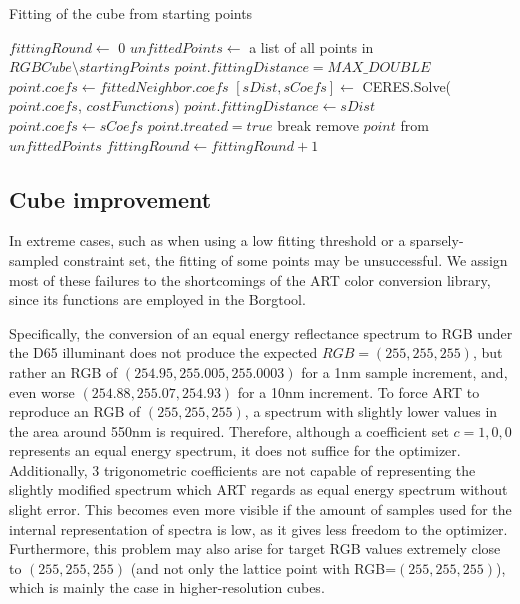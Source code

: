 \begin{algorithm}[t!]
	\caption{Fitting of the cube from starting points}
	\label{alg:upliftingAlgMoments}
	\begin{algorithmic}[1]
		\State $fittingRound \gets$ $0$
		\State $unfittedPoints \gets$ a list of all points in $RGBCube \setminus startingPoints$
		\State $point.fittingDistance = MAX\_DOUBLE$
		\EndFor
		 \label{algStep:coefficientRecomputation}
		\Else
		\State $point.coefs \gets fittedNeighbor.coefs$
		\EndIf 
		\State $[sDist,sCoefs]\gets$ CERES.Solve($point.coefs$, $costFunctions$)
		\State $point.fittingDistance \gets sDist$
		\State $point.coefs \gets sCoefs$
		\EndIf
		\State $point.treated = true$
		\State break
		\EndIf
		\EndFor
		\State remove $point$ from $unfittedPoints$
		\EndIf
		\EndFor	
		\State $fittingRound \gets fittingRound+1$
		\EndWhile
	\end{algorithmic}
\end{algorithm}

\subsection{Cube improvement} \label{ssec:cubeImprovement}

In extreme cases, such as when using a low fitting threshold or a sparsely-sampled constraint set, the fitting of some points may be unsuccessful. We assign most of these failures to the shortcomings of the ART color conversion library, since its functions are employed in the Borgtool.

Specifically, the conversion of an equal energy reflectance spectrum to RGB under the D65 illuminant does not produce the expected $RGB = (255, 255, 255)$, but rather an RGB of $(254.95, 255.005, 255.0003)$ for a 1nm sample increment, and, even worse $(254.88, 255.07, 254.93)$ for a 10nm increment. To force ART to reproduce an RGB of $(255, 255, 255)$, a spectrum with slightly lower values in the area around 550nm is required. Therefore, although a coefficient set $c = {1, 0, 0}$ represents an equal energy spectrum, it does not suffice for the optimizer. Additionally, 3 trigonometric coefficients are not capable of representing the slightly modified spectrum which ART regards as equal energy spectrum without slight error. This becomes even more visible if the amount of samples used for the internal representation of spectra is low, as it gives less freedom to the optimizer. Furthermore, this problem may also arise for target RGB values extremely close to $(255, 255, 255)$ (and not only the lattice point with RGB=$(255,255,255)$), which is mainly the case in higher-resolution cubes.

